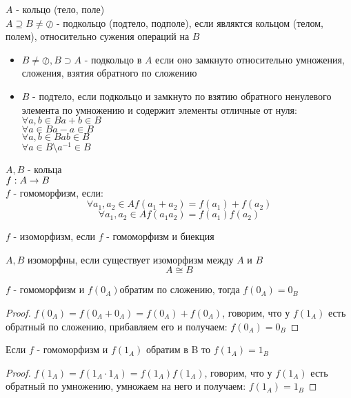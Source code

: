 \begin{Def}
$A$ - кольцо (тело, поле)\\
	$A \supseteq B \neq \oslash$ - подкольцо (подтело, подполе), если являктся кольцом (телом, полем), относительно сужения операций на $B$\\
\end{Def}


\begin{Rem}
\begin{itemize}
	\item $ B \neq \oslash ,	B \supset A$ - подкольцо в $A$ если оно замкнуто относительно умножения, сложения, взятия обратного по сложению
	\item $B$ - подтело, если подкольцо и замкнуто по взятию обратного ненулевого элемента по умножению и содержит элементы отличные от нуля:\\
	$ \forall a, b \in B a + b \in B$\\
	$ \forall a \in B a -a \in B$\\
	$ \forall a,b \in B ab \in B$\\
	$ \forall a \in B \setminus a^{-1} \in B$\\
\end{itemize}
\end{Rem}

\begin{Def}
 $A, B$ - кольца\\
	$f: A \rightarrow B$\\
	$f$ - гомоморфизм, если:\\
		$$ \forall a_1, a_2 \in A f(a_1 + a_2) = f(a_1) + f(a_2) $$
		$$ \forall a_1, a_2 \in A f(a_1a_2) = f(a_1)f(a_2) $$
\end{Def}

\begin{Def}		
	$f$ - изоморфизм, если $f$ - гомоморфизм и биекция\\
\end{Def}

$A, B$ изоморфны, если существует изоморфизм между $A$ и $B$
	 $$ A \cong B $$
\begin{Rem}
	$f$ - гомоморфизм и $f(0_A)$обратим по сложению, тогда $f(0_A) = 0_B$
\end{Rem}
\begin{proof}
	$f(0_A) = f(0_A + 0_A) = f(0_A) + f(0_A)$, говорим, что у $f(1_A)$ есть обратный по сложению,
	прибавляем его и получаем: $f(0_A) = 0_B$
\end{proof}

\begin{Rem}
	Если $f$ - гомоморфизм и $f(1_A)$ обратим в B то $f(1_A)=1_B$
\end{Rem}
\begin{proof}
	$f(1_A) = f(1_A \cdot 1_A) = f(1_A)f(1_A)$, говорим, что у $f(1_A)$ есть обратный по умножению,
	умножаем на него и получаем: $f(1_A) = 1_B$
\end{proof}
	
